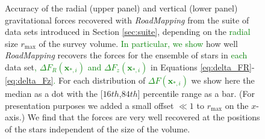 \documentclass[iop,revtex4,numberedappendix,appendixfloats]{emulateapj}
\newcommand{\vect}[1]{\boldsymbol{#1}}
\newcommand{\RM}{{\sl RoadMapping}}
\newcommand{\NEW}[1]{\textcolor{Green}{#1}}
\newcommand{\OLD}[1]{}
\begin{document}
\begin{figure}[!htbp]
  \caption{Accuracy of the radial (upper panel\OLD{s}) and vertical (lower panel\OLD{s}) gravitational forces recovered with \RM{} from the suite of data sets introduced in Section \ref{sec:suite}, depending on the \NEW{radial} size $r_\text{max}$ of the survey volume. \NEW{In particular, we show}\OLD{The left panels show} how well \RM{} recovers the forces for the ensemble of stars in \OLD{the}\NEW{each} data set\NEW{,} \OLD{(}\OLD{$\Delta F_{R}(*_i)$ and $\Delta F_{z}(*_i)$}\NEW{$\Delta F_{R}(\vect{x}_{*,i})$ and $\Delta F_{z}(\vect{x}_{*,i})$} in Equations \eqref{eq:delta_FR}-\eqref{eq:delta_Fz}\OLD{)}\NEW{.}\OLD{and the right panels test the predictive power of each of the data sets' best-fit potential by showing how well the forces are recovered at regular grid points in a large cylinder of $r_\text{max}=5~\text{kpc}$ and height $|z|=1.5~\text{kpc}$ around the survey volumes' center (\OLD{$\Delta F_{R}(g_j)$ and $\Delta F_{z}(g_j)$}\NEW{$\Delta F_{R}(\vect{x}_{g,j})$ and $\Delta F_{z}(\vect{x}_{g,j})$} in Equations \eqref{eq:delta_FR_grid}-\eqref{eq:delta_Fz_grid}).} For each distribution of \OLD{$\Delta F(*_i)$}\NEW{$\Delta F(\vect{x}_{*,i})$} \OLD{and $\Delta F(g_j)$} we show here the median as a dot with the  [$16th$,$84th$] percentile range as a bar. (For presentation purposes we added a small offset $\ll 1$ to $r_\text{max}$ on the $x$-axis.) We find that the forces are very well recovered at the positions of the stars independent of the size of the volume. \OLD{The spiral arms introduce some biases in the overall recovered potential and we need at least a survey volume of $r_\text{max}=3~\text{kpc}$ to get a potential with a reasonable predictive power.}}
\label{fig:forces_bias_a}
\end{figure}
\end{document}

